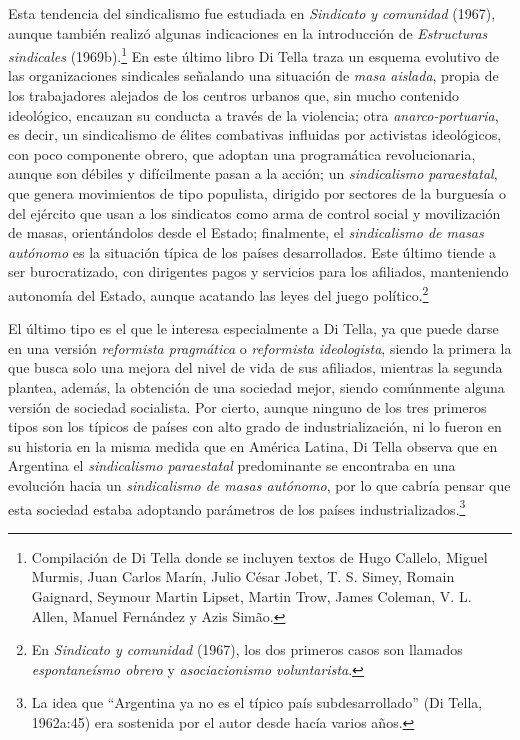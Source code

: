 Esta tendencia del sindicalismo fue estudiada en \emph{Sindicato y comunidad} (1967), aunque también realizó algunas indicaciones en la introducción de \emph{Estructuras sindicales} (1969b).\footnote{Compilación de Di Tella donde se incluyen textos de Hugo Callelo, Miguel Murmis, Juan Carlos Marín, Julio César Jobet, T. S. Simey, Romain Gaignard, Seymour Martin Lipset, Martin Trow, James Coleman, V. L. Allen, Manuel Fernández y Azis Simão.} En este último libro Di Tella traza un esquema evolutivo de las organizaciones sindicales señalando una situación de \emph{masa aislada}, propia de los trabajadores alejados de los centros urbanos que, sin mucho contenido ideológico, encauzan su conducta a través de la violencia; otra \emph{anarco-portuaria}, es decir, un sindicalismo de élites combativas influidas por activistas ideológicos, con poco componente obrero, que adoptan una programática revolucionaria, aunque son débiles y difícilmente pasan a la acción; un \emph{sindicalismo paraestatal}, que genera movimientos de tipo populista, dirigido por sectores de la burguesía o del ejército que usan a los sindicatos como arma de control social y movilización de masas, orientándolos desde el Estado; finalmente, el \emph{sindicalismo de masas autónomo} es la situación típica de los países desarrollados. Este último tiende a ser burocratizado, con dirigentes pagos y servicios para los afiliados, manteniendo autonomía del Estado, aunque acatando las leyes del juego político.\footnote{En \emph{Sindicato y comunidad} (1967), los dos primeros casos son llamados \emph{espontaneísmo obrero} y \emph{asociacionismo voluntarista}.}

El último tipo es el que le interesa especialmente a Di Tella, ya que puede darse en una versión \emph{reformista pragmática} o \emph{reformista ideologista}, siendo la primera la que busca solo una mejora del nivel de vida de sus afiliados, mientras la segunda plantea, además, la obtención de una sociedad mejor, siendo comúnmente alguna versión de sociedad socialista. Por cierto, aunque ninguno de los tres primeros tipos son los típicos de países con alto grado de industrialización, ni lo fueron en su historia en la misma medida que en América Latina, Di Tella observa que en Argentina el \emph{sindicalismo paraestatal} predominante se encontraba en una evolución hacia un \emph{sindicalismo de masas autónomo}, por lo que cabría pensar que esta sociedad estaba adoptando parámetros de los países industrializados.\footnote{La idea que ``Argentina ya no es el típico país subdesarrollado'' (Di Tella, 1962a:45) era sostenida por el autor desde hacía varios años.}

